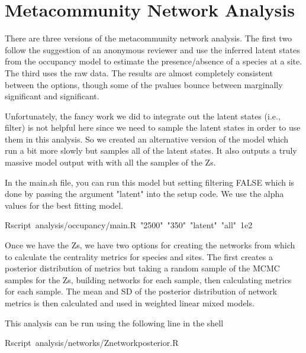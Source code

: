 \documentclass{article}\usepackage[]{graphicx}\usepackage[]{color}
\makeatletter
\newcommand{\hlnum}[1]{\textcolor[rgb]{0.686,0.059,0.569}{#1}}%
\newcommand{\hlstr}[1]{\textcolor[rgb]{0.192,0.494,0.8}{#1}}%
\newcommand{\hlopt}[1]{\textcolor[rgb]{0,0,0}{#1}}%
\newcommand{\hlstd}[1]{\textcolor[rgb]{0.345,0.345,0.345}{#1}}%
\newenvironment{kframe}{%
 \def\at@end@of@kframe{}%
 \ifinner\ifhmode%
  \def\at@end@of@kframe{\end{minipage}}%
  \begin{minipage}{\columnwidth}%
 \fi\fi%
 \def\FrameCommand##1{\hskip\@totalleftmargin \hskip-\fboxsep
 \colorbox{shadecolor}{##1}\hskip-\fboxsep
     \hskip-\linewidth \hskip-\@totalleftmargin \hskip\columnwidth}%
 \MakeFramed {\advance\hsize-\width
   \@totalleftmargin\z@ \linewidth\hsize
   \@setminipage}}%
 {\par\unskip\endMakeFramed%
 \at@end@of@kframe}
\newenvironment{knitrout}{}{} %
\makeatother
\begin{document}
\section{Metacommunity Network Analysis}

There are three versions of the metacommunity network analysis. The
first two follow the suggestion of an anonymous reviewer and use the
inferred latent states from the occupancy model to estimate the
presence/absence of a species at a site. The third uses the raw
data. The results are almost completely consistent between the options,
though some of the pvalues bounce between marginally significant and
significant. 

Unfortunately, the fancy work we did to integrate out the latent
states (i.e., filter) is not helpful here since we need to sample the latent states
in order to use them in this analysis. So we created an alternative
version of the model which run a bit more slowly but samples all of
the latent states. It also outputs a truly massive model output with
with all the samples of the Zs.

In the main.sh file, you can run this model but setting filtering
FALSE which is done by passing the argument "latent" into the setup
code. We use the alpha values for the best fitting model. 

\begin{knitrout}
\color{fgcolor}\begin{kframe}
\noindent
\ttfamily
\hlstd{Rscript\ analysis}\hlopt{/}\hlstd{occupancy}\hlopt{/}\hlstd{main.R\ }\hlstr{"2500"}\hlstd{\ }\hlstr{"350"}\hlstd{\ }\hlstr{"latent"}\hlstd{\ }\hlstr{"all"}\hlstd{\ }\hlnum{1}\hlstd{e2}\hspace*{\fill}
\mbox{}
\normalfont
\end{kframe}
\end{knitrout}

Once we have the Zs, we have two options for creating the networks
from which to calculate the centrality metrics for species and
sites. The first creates a posterior distribution of metrics but
taking a random sample of the MCMC samples for the Zs, building
networks for each sample, then calculating metrics for each
sample. The mean and SD of the posterior distribution of network
metrics is then calculated and used in weighted linear mixed models. 


This analysis can be run using the following line in the shell

\begin{knitrout}
\color{fgcolor}\begin{kframe}
\noindent
\ttfamily
\hlstd{Rscript\ analysis}\hlopt{/}\hlstd{networks}\hlopt{/}\hlstd{Znetwork\textunderscore posterior.R}\hspace*{\fill}
\mbox{}
\normalfont
\end{kframe}
\end{knitrout}
\end{document}
